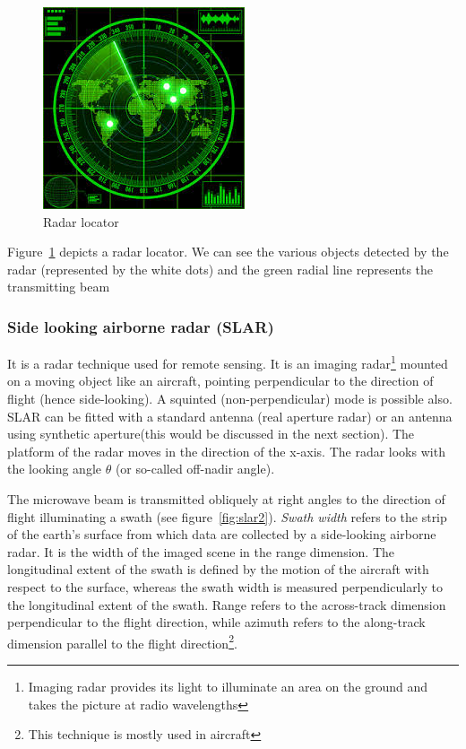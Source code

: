 \begin{figure}[h]
\centering
\includegraphics[scale=0.5]{./graphics/radarlocator}
\caption{Radar locator}
\label{fig:radarlocator}
\end{figure}

Figure~\ref{fig:radarlocator} depicts a radar locator. We can see the various objects detected by the radar (represented by the white dots) and the green radial line represents the transmitting beam

\subsubsection{Side looking airborne radar (SLAR)} 
It is a radar technique used for remote sensing. It is an imaging radar\footnote{Imaging radar provides its light to illuminate an area on the ground and takes the picture at radio wavelengths} mounted on a moving object like an aircraft, pointing perpendicular to the direction of flight (hence side-looking). A squinted (non-perpendicular) mode is possible also. SLAR can be fitted with a standard antenna (real aperture radar) or an antenna using synthetic aperture(this would be discussed in the next section). The platform of the radar moves in the direction of the x-axis. The radar looks with the looking angle $\theta$ (or so-called off-nadir angle).

The microwave beam is transmitted obliquely at right angles to the direction of flight illuminating a swath (see figure~\ref{fig:slar2}). \textit{Swath width} refers to the strip of the earth's surface from which data are collected by a side-looking airborne radar. It is the width of the imaged scene in the range dimension. The longitudinal extent of the swath is defined by the motion of the aircraft with respect to the surface, whereas the swath width is measured perpendicularly to the longitudinal extent of the swath. Range refers to the across-track dimension perpendicular to the flight direction, while azimuth refers to the along-track dimension parallel to the flight direction\footnote{This technique is mostly used in aircraft}.


